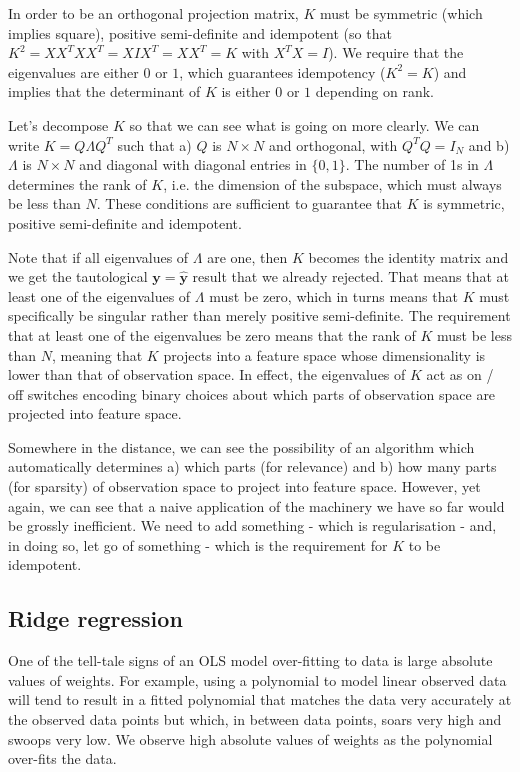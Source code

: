 \documentclass[11pt]{article}
\begin{document}
	In order to be an orthogonal projection matrix, $K$ must be symmetric (which implies square), positive semi-definite and idempotent (so that $K^{2} = XX^{T}XX^{T} = XIX^{T} = XX^{T} = K$ with $X^{T}X = I$). We require that the eigenvalues are either $0$ or $1$, which guarantees idempotency ($K^2 = K$) and implies that the determinant of $K$ is either $0$ or $1$ depending on rank.
	
	Let's decompose $K$ so that we can see what is going on more clearly. We can write $K = Q \Lambda Q^{T}$ such that a) $Q$ is $N \times N$ and orthogonal, with $Q^{T}Q = I_{N}$ and b) $\Lambda$ is $N \times N$ and diagonal with diagonal entries in $\{0, 1\}$. The number of 1s in $\Lambda$ determines the rank of $K$, i.e. the dimension of the subspace, which must always be less than $N$. These conditions are sufficient to guarantee that $K$ is symmetric, positive semi-definite and idempotent.
	
	Note that if all eigenvalues of $\Lambda$ are one, then $K$ becomes the identity matrix and we get the tautological $\boldsymbol{y} = \boldsymbol{\hat{y}}$ result that we already rejected. That means that at least one of the eigenvalues of $\Lambda$ must be zero, which in turns means that $K$ must specifically be singular rather than merely positive semi-definite. The requirement that at least one of the eigenvalues be zero means that the rank of $K$ must be less than $N$, meaning that $K$ projects into a feature space whose dimensionality is lower than that of observation space. In effect, the eigenvalues of $K$ act as on / off switches encoding binary choices about which parts of observation space are projected into feature space.
	
	Somewhere in the distance, we can see the possibility of an algorithm which automatically determines a) which parts (for relevance) and b) how many parts (for sparsity) of observation space to project into feature space. However, yet again, we can see that a naive application of the machinery we have so far would be grossly inefficient. We need to add something - which is regularisation - and, in doing so, let go of something - which is the requirement for $K$ to be idempotent.
	
	\subsection{Ridge regression}
	
	One of the tell-tale signs of an OLS model over-fitting to data is large absolute values of weights. For example, using a polynomial to model linear observed data will tend to result in a fitted polynomial that matches the data very accurately at the observed data points but which, in between data points, soars very high and swoops very low. We observe high absolute values of weights as the polynomial over-fits the data.
	
\end{document}

